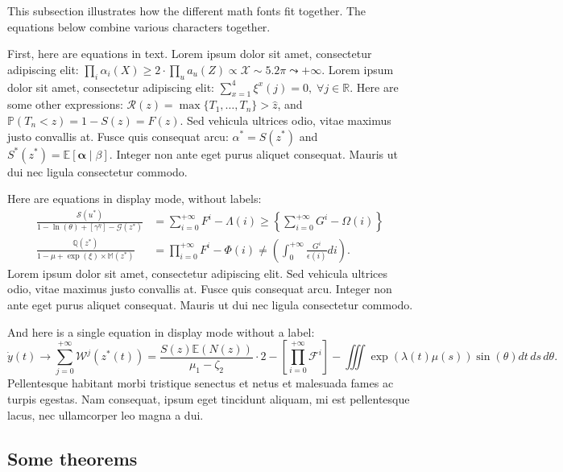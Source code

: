 \documentclass[letterpaper,11pt,leqno]{article}
\begin{document}
This subsection illustrates how the different math fonts fit together. The equations below combine various characters together.

First, here are equations in text. Lorem ipsum dolor sit amet, consectetur adipiscing elit: $\prod_i\alpha_i(X) \geq 2 \cdot\prod_u a_u(Z) \propto \mathcal{X} \sim 5.2\pi \leadsto +\infty$. Lorem ipsum dolor sit amet, consectetur adipiscing elit: $\sum_{x=1}^4 \xi^x(j)=0, \; \forall j\in \mathbb{R}$. Here are some other expressions: $\mathcal{R}(z) = \max\{T_1,\ldots,T_{n}\} > \hat{z}$, and  $\mathbb{P}(T_n < z) = 1 - S(z) = F(z)$.  Sed vehicula ultrices odio, vitae maximus justo convallis at. Fusce quis consequat arcu: $\alpha^* = S(z^*)$ and $S^*(z^*)=\mathbb{E}[\bm{\alpha}\mid \beta]$. Integer non ante eget purus aliquet consequat. Mauris ut dui nec ligula consectetur commodo.

Here are equations in display mode, without labels:
\begin{align*}
\frac{\mathcal{S}(u^*)}{1 -\ln(\theta) + \left[\gamma^\eta\right] - \mathcal{G}(z^*)} &= \sum_{i=0}^{+\infty}F^{i} - \Lambda(i) \geq \left\lbrace\sum_{i=0}^{+\infty}G^{i} - \Omega(i)\right\rbrace\\
\frac{\mathbb{Q}(z^*)}{1 -\mu + \exp(\xi) \times \mathbb{M}(z^*)} &= \prod_{i=0}^{+\infty}F^{i} - \Phi(i) \neq \left(\int_{0}^{+\infty}\frac{G^{i}}{\epsilon(i)} di\right).
\end{align*}
Lorem ipsum dolor sit amet, consectetur adipiscing elit. Sed vehicula ultrices odio, vitae maximus justo convallis at. Fusce quis consequat arcu. Integer non ante eget purus aliquet consequat. Mauris ut dui nec ligula consectetur commodo.

And here is a single equation in display mode without a label:
\begin{equation*}
\dot{y}(t) \to \sum_{j=0}^{+\infty}\mathcal{W}^j(z^{\ast}(t)) = \frac{S(z) \mathbb{E}(N(z))}{\mu_1 - \zeta_2} \cdot 2 - \left[\prod_{i=0}^{+\infty}\mathcal{F}^{i}\right]-\iiint\exp(\lambda(t) \mu(s)) \sin(\theta)dt\,ds\,d\theta.
\end{equation*}
Pellentesque habitant morbi tristique senectus et netus et malesuada fames ac turpis egestas. Nam consequat, ipsum eget tincidunt aliquam, mi est pellentesque lacus, nec ullamcorper leo magna a dui.

\subsection{Some theorems}
\end{document}
